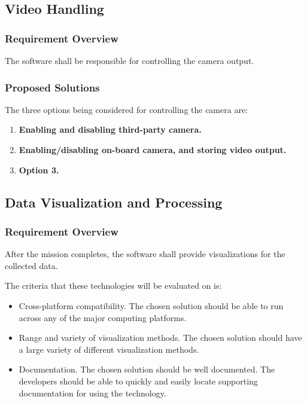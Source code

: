 \documentclass[letterpaper,10pt]{article}
\begin{document}
\subsection{Video Handling}
\subsubsection{Requirement Overview}
The software shall be responsible for controlling the camera output.
\subsubsection{Proposed Solutions}
The three options being considered for controlling the camera are:
\begin{enumerate}
\item{
\textbf{Enabling and disabling third-party camera.}
}

\item{
\textbf{Enabling/disabling on-board camera, and storing video output.}
}

\item{
\textbf{Option 3.}
}
\end{enumerate}

\subsection{Data Visualization and Processing}
\subsubsection{Requirement Overview}
After the mission completes, the software shall provide visualizations for the collected data.

The criteria that these technologies will be evaluated on is:
\begin{itemize}
\item Cross-platform compatibility.
The chosen solution should be able to run across any of the major computing platforms.

\item Range and variety of visualization methods.
The chosen solution should have a large variety of different visualization methods.

\item Documentation.
The chosen solution should be well documented.
The developers should be able to quickly and easily locate supporting documentation for using the technology.
\end{itemize}
\end{document}
